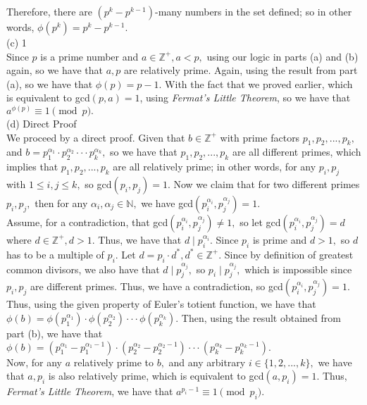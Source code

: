 \documentclass{article}
\begin{document}
\indent Therefore, there are $(p^k - p^{k-1})$-many numbers in the set defined; so in other words, $\phi(p^k) = p^k - p^{k-1}.$ \\[.5cm]
(c) 1 \\[.3cm]
\indent Since $p$ is a prime number and $a\in\mathbb{Z^+}, a < p,$ using our logic in parts (a) and (b) again, so we have that $a, p$ are relatively prime. Again, using the result from part (a), so we have that $\phi(p) = p - 1.$ With the fact that we proved earlier, which is equivalent to gcd$(p, a) = 1$, using \textit{Fermat's Little Theorem}, so we have that $a^{\phi(p)}\equiv1\pmod{p}.$ \\[.5cm]
(d) Direct Proof \\[.3cm]
\indent We proceed by a direct proof. Given that $b\in\mathbb{Z^+}$ with prime factors $p_1, p_2, ..., p_k,$ and $b = p_1^{\alpha_1}\cdot p_2^{\alpha_2}\cdot\cdot\cdot p_k^{\alpha_k},$ so we have that $p_1, p_2, ..., p_k$ are all different primes, which implies that $p_1, p_2, ..., p_k$ are all relatively prime; in other words, for any $p_i, p_j$ with $1\leq i,j\leq k,$ so gcd$(p_i, p_j) = 1.$ Now we claim that for two different primes $p_i, p_j,$ then for any $\alpha_i, \alpha_j\in\mathbb{N},$ we have gcd$(p_i^{\alpha_i}, p_j^{\alpha_j}) = 1.$ \\[.2cm]
\indent Assume, for a contradiction, that gcd$(p_i^{\alpha_i}, p_j^{\alpha_j}) \neq 1,$ so let gcd$(p_i^{\alpha_i}, p_j^{\alpha_j}) = d$ where $d\in\mathbb{Z^+}, d > 1.$ Thus, we have that $d\mid p_i^{\alpha_i}$. Since $p_i$ is prime and $d > 1,$ so $d$ has to be a multiple of $p_i.$ Let $d = p_i\cdot d^*, d^*\in\mathbb{Z^+}.$ Since by definition of greatest common divisors, we also have that $d\mid p_j^{\alpha_j},$ so $p_i\mid p_j^{\alpha_j},$ which is impossible since $p_i, p_j$ are different primes. Thus, we have a contradiction, so gcd$(p_i^{\alpha_i}, p_j^{\alpha_j}) = 1.$ \\[.2cm]
Thus, using the given property of Euler's totient function, we have that $\phi(b) = \phi(p_1^{\alpha_1})\cdot \phi(p_2^{\alpha_2})\cdot\cdot\cdot\phi(p_k^{\alpha_k}).$ Then, using the result obtained from part (b), we have that $\phi(b) = (p_1^{\alpha_1} - p_1^{\alpha_1 - 1})\cdot (p_2^{\alpha_2} - p_2^{\alpha_2 - 1})\cdot\cdot\cdot (p_k^{\alpha_k} - p_k^{\alpha_k - 1}).$ \\[.1cm]
\indent Now, for any $a$ relatively prime to $b,$ and any arbitrary $i\in\{1, 2, ..., k\},$ we have that $a, p_i$ is also relatively prime, which is equivalent to gcd$(a, p_i) = 1.$ Thus, \textit{Fermat's Little Theorem}, we have that $a^{p_i - 1}\equiv1\pmod{p_i}.$ \\[.1cm]
\end{document}
